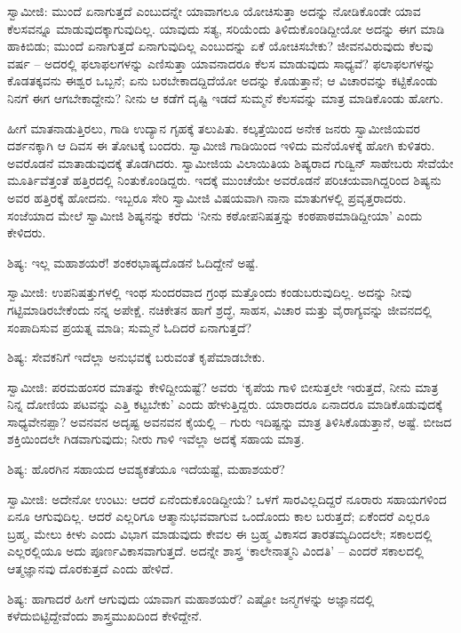ಸ್ವಾಮೀಜಿ: ಮುಂದೆ ಏನಾಗುತ್ತದೆ ಎಂಬುದನ್ನೇ ಯಾವಾಗಲೂ ಯೋಚಿಸುತ್ತಾ ಅದನ್ನು ನೋಡಿಕೊಂಡೇ ಯಾವ ಕೆಲಸವನ್ನೂ ಮಾಡುವುದಕ್ಕಾಗುವುದಿಲ್ಲ. ಯಾವುದು ಸತ್ಯ, ಸರಿಯೆಂದು ತಿಳಿದುಕೊಂಡಿದ್ದೀಯೋ ಅದನ್ನು ಈಗ ಮಾಡಿ ಹಾಕಿಬಿಡು; ಮುಂದೆ ಏನಾಗುತ್ತದೆ ಏನಾಗುವುದಿಲ್ಲ ಎಂಬುದನ್ನು ಏಕೆ ಯೋಚಿಸಬೇಕು? ಜೀವನವಿರುವುದು ಕೆಲವು ವರ್ಷ – ಅದರಲ್ಲಿ ಫಲಾಫಲಗಳನ್ನು ಎಣಿಸುತ್ತಾ ಯಾವನಾದರೂ ಕೆಲಸ ಮಾಡುವುದು ಸಾಧ್ಯವೆ? ಫಲಾಫಲಗಳನ್ನು ಕೊಡತಕ್ಕವನು ಈಶ್ವರ ಒಬ್ಬನೆ; ಏನು ಬರಬೇಕಾದದ್ದಿದೆಯೋ ಅದನ್ನು ಕೊಡುತ್ತಾನೆ; ಆ ವಿಚಾರವನ್ನು ಕಟ್ಟಿಕೊಂಡು ನಿನಗೆ ಈಗ ಆಗಬೇಕಾದ್ದೇನು? ನೀನು ಆ ಕಡೆಗೆ ದೃಷ್ಟಿ ಇಡದೆ ಸುಮ್ಮನೆ ಕೆಲಸವನ್ನು ಮಾತ್ರ ಮಾಡಿಕೊಂಡು ಹೋಗು.

ಹೀಗೆ ಮಾತನಾಡುತ್ತಿರಲು, ಗಾಡಿ ಉದ್ಯಾನ ಗೃಹಕ್ಕೆ ತಲುಪಿತು. ಕಲ್ಕತ್ತೆಯಿಂದ ಅನೇಕ ಜನರು ಸ್ವಾಮೀಜಿಯವರ ದರ್ಶನಕ್ಕಾಗಿ ಆ ದಿವಸ ಈ ತೋಟಕ್ಕೆ ಬಂದರು. ಸ್ವಾಮೀಜಿ ಗಾಡಿಯಿಂದ ಇಳಿದು ಮನೆಯೊಳಕ್ಕೆ ಹೋಗಿ ಕುಳಿತರು. ಅವರೊಡನೆ ಮಾತಾಡುವುದಕ್ಕೆ ತೊಡಗಿದರು. ಸ್ವಾಮೀಜಿಯ ವಿಲಾಯಿತಿಯ ಶಿಷ್ಯರಾದ ಗುಡ್ವಿನ್ ಸಾಹೇಬರು ಸೇವೆಯೇ ಮೂರ್ತಿವೆತ್ತಂತೆ ಹತ್ತಿರದಲ್ಲಿ ನಿಂತುಕೊಂಡಿದ್ದರು. ಇದಕ್ಕೆ ಮುಂಚೆಯೇ ಅವರೊಡನೆ ಪರಿಚಯವಾಗಿದ್ದರಿಂದ ಶಿಷ್ಯನು ಅವರ ಹತ್ತಿರಕ್ಕೆ ಹೋದನು. ಇಬ್ಬರೂ ಸೇರಿ ಸ್ವಾಮೀಜಿ ವಿಷಯವಾಗಿ ನಾನಾ ಮಾತುಗಳಲ್ಲಿ ಪ್ರವೃತ್ತರಾದರು. ಸಂಜೆಯಾದ ಮೇಲೆ ಸ್ವಾಮೀಜಿ ಶಿಷ್ಯನನ್ನು ಕರೆದು ‘ನೀನು ಕಠೋಪನಿಷತ್ತನ್ನು ಕಂಠಪಾಠಮಾಡಿದ್ದೀಯಾ’ ಎಂದು ಕೇಳಿದರು.

ಶಿಷ್ಯ: ಇಲ್ಲ ಮಹಾಶಯರೆ! ಶಂಕರಭಾಷ್ಯದೊಡನೆ ಓದಿದ್ದೇನೆ ಅಷ್ಟೆ.

ಸ್ವಾಮೀಜಿ: ಉಪನಿಷತ್ತುಗಳಲ್ಲಿ ಇಂಥ ಸುಂದರವಾದ ಗ್ರಂಥ ಮತ್ತೊಂದು ಕಂಡುಬರುವುದಿಲ್ಲ. ಅದನ್ನು ನೀವು ಗಟ್ಟಿಮಾಡಿರಬೇಕೆಂದು ನನ್ನ ಅಪೇಕ್ಷೆ. ನಚಿಕೇತನ ಹಾಗೆ ಶ್ರದ್ಧೆ, ಸಾಹಸ, ವಿಚಾರ ಮತ್ತು ವೈರಾಗ್ಯವನ್ನು ಜೀವನದಲ್ಲಿ ಸಂಪಾದಿಸುವ ಪ್ರಯತ್ನ ಮಾಡಿ; ಸುಮ್ಮನೆ ಓದಿದರೆ ಏನಾಗುತ್ತದೆ?

ಶಿಷ್ಯ: ಸೇವಕನಿಗೆ ಇದೆಲ್ಲಾ ಅನುಭವಕ್ಕೆ ಬರುವಂತೆ ಕೃಪೆಮಾಡಬೇಕು.

ಸ್ವಾಮೀಜಿ: ಪರಮಹಂಸರ ಮಾತನ್ನು ಕೇಳಿದ್ದೀಯಷ್ಟೆ? ಅವರು ‘ಕೃಪೆಯ ಗಾಳಿ ಬೀಸುತ್ತಲೇ ಇರುತ್ತದೆ, ನೀನು ಮಾತ್ರ ನಿನ್ನ ದೋಣಿಯ ಪಟವನ್ನು ಎತ್ತಿ ಕಟ್ಟಬೇಕು’ ಎಂದು ಹೇಳುತ್ತಿದ್ದರು. ಯಾರಾದರೂ ಏನಾದರೂ ಮಾಡಿಕೊಡುವುದಕ್ಕೆ ಸಾಧ್ಯವೇನಪ್ಪಾ? ಅವನವನ ಅದೃಷ್ಟ ಅವನವನ ಕೈಯಲ್ಲಿ – ಗುರು ಇದಿಷ್ಟನ್ನು ಮಾತ್ರ ತಿಳಿಸಿಕೊಡುತ್ತಾನೆ, ಅಷ್ಟೆ. ಬೀಜದ ಶಕ್ತಿಯಿಂದಲೇ ಗಿಡವಾಗುವುದು; ನೀರು ಗಾಳಿ ಇವೆಲ್ಲಾ ಅದಕ್ಕೆ ಸಹಾಯ ಮಾತ್ರ.

ಶಿಷ್ಯ: ಹೊರಗಿನ ಸಹಾಯದ ಆವಶ್ಯಕತೆಯೂ ಇದೆಯಷ್ಟೆ, ಮಹಾಶಯರೆ?

ಸ್ವಾಮೀಜಿ: ಅದೇನೋ ಉಂಟು: ಆದರೆ ಏನೆಂದುಕೊಂಡಿದ್ದೀಯೆ? ಒಳಗೆ ಸಾರವಿಲ್ಲದಿದ್ದರೆ ನೂರಾರು ಸಹಾಯಗಳಿಂದ ಏನೂ ಆಗುವುದಿಲ್ಲ. ಆದರೆ ಎಲ್ಲರಿಗೂ ಆತ್ಮಾನುಭವವಾಗುವ ಒಂದೊಂದು ಕಾಲ ಬರುತ್ತದೆ; ಏಕೆಂದರೆ ಎಲ್ಲರೂ ಬ್ರಹ್ಮ, ಮೇಲು ಕೀಳು ಎಂದು ವಿಭಾಗ ಮಾಡುವುದು ಕೇವಲ ಈ ಬ್ರಹ್ಮ ವಿಕಾಸದ ತಾರತಮ್ಯದಿಂದಲೇ; ಸಕಾಲದಲ್ಲಿ ಎಲ್ಲರಲ್ಲಿಯೂ ಅದು ಪೂರ್ಣವಿಕಾಸವಾಗುತ್ತದೆ. ಅದನ್ನೇ ಶಾಸ್ತ್ರ ‘ಕಾಲೇನಾತ್ಮನಿ ವಿಂದತಿ’ – ಎಂದರೆ ಸಕಾಲದಲ್ಲಿ ಆತ್ಮಜ್ಞಾನವು ದೊರಕುತ್ತದೆ ಎಂದು ಹೇಳಿದೆ.

ಶಿಷ್ಯ: ಹಾಗಾದರೆ ಹೀಗೆ ಆಗುವುದು ಯಾವಾಗ ಮಹಾಶಯರೆ? ಎಷ್ಟೋ ಜನ್ಮಗಳನ್ನು ಅಜ್ಞಾನದಲ್ಲಿ ಕಳೆದುಬಿಟ್ಟಿದ್ದೇವೆಂದು ಶಾಸ್ತ್ರಮುಖದಿಂದ ಕೇಳಿದ್ದೇನೆ.

